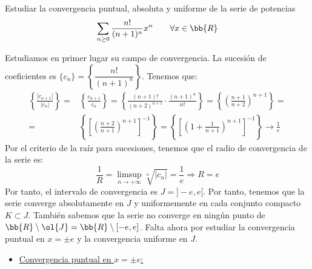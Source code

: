 \begin{ejercicio}
    Estudiar la convergencia puntual, absoluta y uniforme de la serie de potencias
    \begin{equation*}
        \sum\limits_{n\geq 0} \frac{n!}{(n+1)^n}x^n \qquad \forall x\in\bb{R}
    \end{equation*}

    Estudiamos en primer lugar su campo de convergencia. La sucesión de coeficientes es
    $\{c_n\} = \left\{\dfrac{n!}{(n+1)^n}\right\}$. Tenemos que:
    \begin{align*}
        \left\{\frac{\left|c_{n+1}\right|}{\left|c_n\right|}\right\} =& \left\{\frac{c_{n+1}}{c_n}\right\}=\left\{\frac{(n+1)!}{(n+2)^{n+1}} \cdot \frac{(n+1)^n}{n!}\right\}
        = \left\{\left(\frac{n+1}{n+2}\right)^{n+1}\right\} =\\
        =& \left\{\left[\left(\frac{n+2}{n+1}\right)^{n+1}\right]^{-1}\right\} 
        = \left\{\left[\left(1+\frac{1}{n+1}\right)^{n+1}\right]^{-1}\right\} \to \frac{1}{e}
    \end{align*}
    Por el criterio de la raíz para sucesiones, tenemos que el radio de convergencia de la serie es:
    \begin{equation*}
        \frac{1}{R} = \limsup_{n\to +\infty}\sqrt[n]{\left|c_n\right|} = \frac{1}{e} \Longrightarrow R = e
    \end{equation*}
    Por tanto, el intervalo de convergencia es $J=]-e, e[$. Por tanto, tenemos que la serie converge absolutamente en $J$
    y uniformemente en cada conjunto compacto $K\subset J$. También sabemos que la serie no converge en ningún
    punto de $\bb{R}\setminus \ol{J}=\bb{R}\setminus [-e, e]$. Falta ahora por estudiar la convergencia puntual en $x=\pm e$ y la convergencia uniforme en $J$.
    \begin{itemize}
        \item \ul{Convergencia puntual en $x=\pm e$:}


\end{itemize}
\end{ejercicio}
